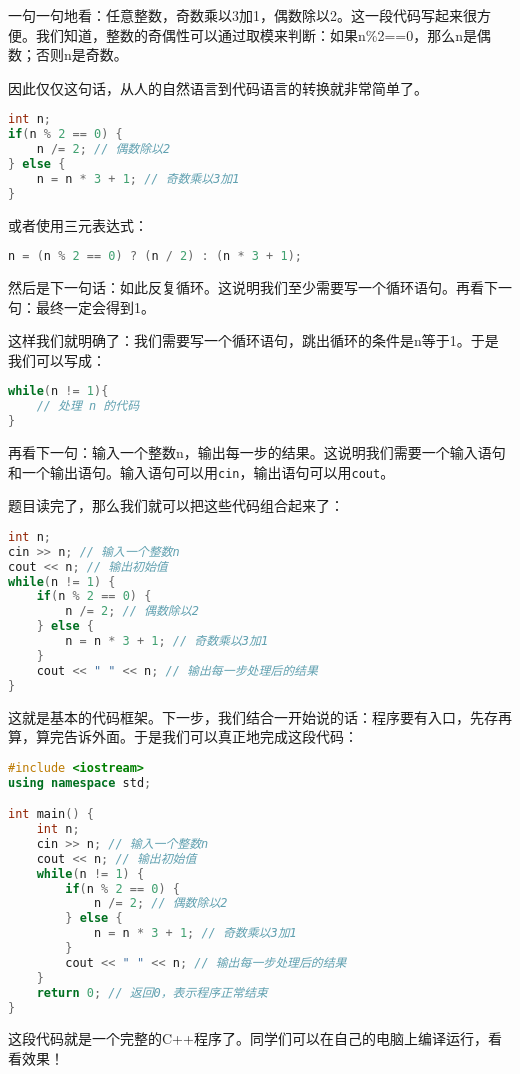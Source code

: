 \documentclass[../main.tex]{subfiles}
\begin{document}
\begin{answer}
  一句一句地看：任意整数，奇数乘以3加1，偶数除以2。这一段代码写起来很方便。我们知道，整数的奇偶性可以通过取模来判断：如果n\%2==0，那么n是偶数；否则n是奇数。

  因此仅仅这句话，从人的自然语言到代码语言的转换就非常简单了。
\begin{lstlisting}[language=C++]
int n;
if(n % 2 == 0) {
    n /= 2; // 偶数除以2
} else {
    n = n * 3 + 1; // 奇数乘以3加1
}
\end{lstlisting}

  或者使用三元表达式：
\begin{lstlisting}[language=C++]
n = (n % 2 == 0) ? (n / 2) : (n * 3 + 1);
\end{lstlisting}

  然后是下一句话：如此反复循环。这说明我们至少需要写一个循环语句。再看下一句：最终一定会得到1。

  这样我们就明确了：我们需要写一个循环语句，跳出循环的条件是n等于1。于是我们可以写成：
\begin{lstlisting}[language=C++]
while(n != 1){
    // 处理 n 的代码
}
\end{lstlisting}

  再看下一句：输入一个整数n，输出每一步的结果。这说明我们需要一个输入语句和一个输出语句。输入语句可以用\texttt{cin}，输出语句可以用\texttt{cout}。

  题目读完了，那么我们就可以把这些代码组合起来了：
\begin{lstlisting}[language=C++]
int n;
cin >> n; // 输入一个整数n
cout << n; // 输出初始值
while(n != 1) {
    if(n % 2 == 0) {
        n /= 2; // 偶数除以2
    } else {
        n = n * 3 + 1; // 奇数乘以3加1
    }
    cout << " " << n; // 输出每一步处理后的结果
}
\end{lstlisting}
  这就是基本的代码框架。下一步，我们结合一开始说的话：程序要有入口，先存再算，算完告诉外面。于是我们可以真正地完成这段代码：
\begin{lstlisting}[language=C++]
#include <iostream>
using namespace std;

int main() {
    int n;
    cin >> n; // 输入一个整数n
    cout << n; // 输出初始值
    while(n != 1) {
        if(n % 2 == 0) {
            n /= 2; // 偶数除以2
        } else {
            n = n * 3 + 1; // 奇数乘以3加1
        }
        cout << " " << n; // 输出每一步处理后的结果
    }
    return 0; // 返回0，表示程序正常结束
}
\end{lstlisting}
  这段代码就是一个完整的C++程序了。同学们可以在自己的电脑上编译运行，看看效果！
\end{answer}
\end{document}
